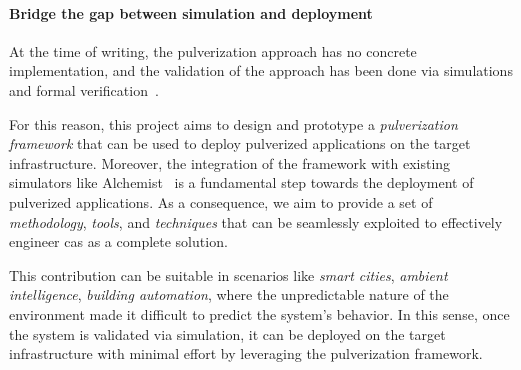 \documentclass[12pt,a4paper]{article}
\begin{document}
\paragraph{Bridge the gap between simulation and deployment}\label{sec:bridge-gap}

At the time of writing,
the pulverization approach has no concrete implementation,
and the validation of the approach has been done via simulations and formal verification~\cite{DBLP:journals/fi/CasadeiPPVW20, DBLP:journals/iotj/CasadeiFPPSV22}.

For this reason,
this project aims to design and prototype a \emph{pulverization framework} that can be used to deploy pulverized applications on the target infrastructure.
%
Moreover,
the integration of the framework with existing simulators like Alchemist~\cite{DBLP:journals/jos/PianiniMV13} is a fundamental step towards the deployment of pulverized applications.
%
As a consequence,
we aim to provide a set of \emph{methodology},
\emph{tools},
and \emph{techniques} that can be seamlessly exploited to effectively engineer \ac{cas} as a complete solution.

This contribution can be suitable in scenarios like \emph{smart cities},
\emph{ambient intelligence},
\emph{building automation},
where the unpredictable nature of the environment made it difficult to predict the system's behavior.
%
In this sense, once the system is validated via simulation,
it can be deployed on the target infrastructure with minimal effort by leveraging the pulverization framework.
\end{document}
